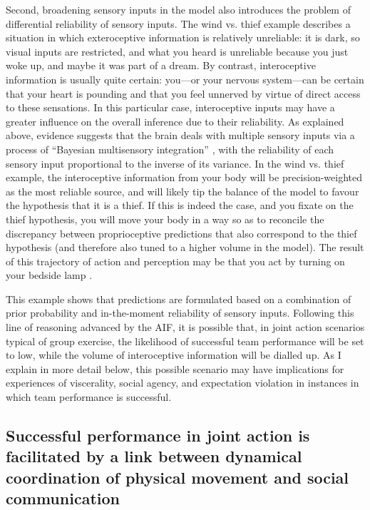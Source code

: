 \begin{CJK}{UTF8}{gbsn}
Second, broadening sensory inputs in the model also introduces the problem of differential reliability of sensory inputs.  The wind vs. thief example describes a situation in which exteroceptive information is relatively unreliable: it is dark, so visual inputs are restricted, and what you heard is unreliable because you just woke up, and maybe it was part of a dream.  By contrast, interoceptive information is usually quite certain: you---or your nervous system---can be certain that your heart is pounding and that you feel unnerved by virtue of direct access to these sensations.  In this particular case, interoceptive inputs may have a greater influence on the overall inference due to their reliability.  As explained above, evidence suggests that the brain deals with multiple sensory inputs via a process of ``Bayesian multisensory integration'' \citep{Ernst2004}, with the reliability of each sensory input proportional to the inverse of its variance.  In the wind vs. thief example, the interoceptive information from your body will be precision-weighted as the most reliable source, and will likely tip the balance of the model to favour the hypothesis that it is a thief.  If this is indeed the case, and you fixate on the thief hypothesis, you will move your body in a way so as to reconcile the discrepancy between proprioceptive predictions that also correspond to the thief hypothesis (and therefore also tuned to a higher volume in the model).  The result of this trajectory of action and perception may be that you act by turning on your bedside lamp \citep{Pezzulo2014}.

This example shows that predictions are formulated based on a combination of prior probability and in-the-moment reliability of sensory inputs.  Following this line of reasoning advanced by the AIF, it is possible that, in joint action scenarios typical of group exercise, the likelihood of successful team performance will be set to low, while the volume of interoceptive information will be dialled up.  As I explain in more detail below, this possible scenario may have implications for experiences of viscerality, social agency, and expectation violation in instances in which team performance is successful.

\subsection{Successful performance in joint action is facilitated by a link between dynamical coordination of physical movement and social communication}


\end{CJK}
